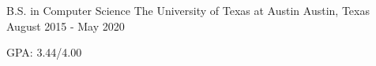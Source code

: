 


\begin{cventries}


\cventry
{B.S. in Computer Science} %
{The University of Texas at Austin} %
{Austin, Texas} %
{August 2015 - May 2020} %
{ %
\begin{cvitems}
\item{GPA: 3.44/4.00}
\end{cvitems}
}


\end{cventries}